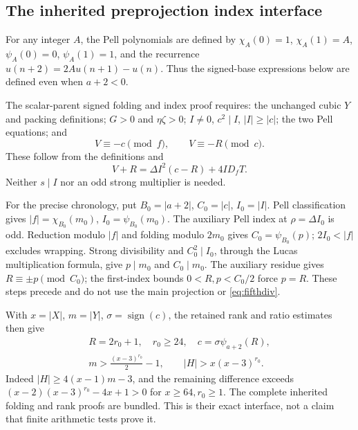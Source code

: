 \subsection{The inherited preprojection index interface}
For any integer $A$, the Pell polynomials are defined by $\chi_A(0)=1$, $\chi_A(1)=A$, $\psi_A(0)=0$, $\psi_A(1)=1$, and the recurrence $u(n+2)=2Au(n+1)-u(n)$. Thus the signed-base expressions below are defined even when $a+2<0$.

The scalar-parent signed folding and index proof requires: the unchanged cubic $Y$ and packing definitions; $G>0$ and $\eta\zeta>0$; $I\ne0$, $c^2\mid I$, $|I|\ge|c|$; the two Pell equations; and
\[
 V\equiv-c\pmod f,\qquad V\equiv-R\pmod c.
\]
These follow from the definitions and
\[
 V+R=\Delta I^2(c-R)+4ID_fT.
\]
Neither $s\mid I$ nor an odd strong multiplier is needed.

For the precise chronology, put $B_0=|a+2|$, $C_0=|c|$, $I_0=|I|$. Pell classification gives $|f|=\chi_{B_0}(m_0)$, $I_0=\psi_{B_0}(m_0)$. The auxiliary Pell index at $\rho=\Delta I_0$ is odd. Reduction modulo $|f|$ and folding modulo $2m_0$ gives $C_0=\psi_{B_0}(p)$; $2I_0<|f|$ excludes wrapping. Strong divisibility and $C_0^2\mid I_0$, through the Lucas multiplication formula, give $p\mid m_0$ and $C_0\mid m_0$. The auxiliary residue gives $R\equiv\pm p\pmod{C_0}$; the first-index bounds $0<R,p<C_0/2$ force $p=R$. These steps precede and do not use the main projection or \eqref{eq:fifthdiv}.

With $x=|X|$, $m=|Y|$, $\sigma=\operatorname{sign}(c)$, the retained rank and ratio estimates then give
\begin{equation}\label{eq:indexbounds}
\begin{gathered}
 R=2r_0+1,\quad r_0\ge24,\quad c=\sigma\psi_{a+2}(R),\\
 m>\frac{(x-3)^{r_0}}2-1,\qquad |H|>x(x-3)^{r_0}.
\end{gathered}
\end{equation}
Indeed $|H|\ge4(x-1)m-3$, and the remaining difference exceeds $(x-2)(x-3)^{r_0}-4x+1>0$ for $x\ge64,r_0\ge1$. The complete inherited folding and rank proofs are bundled. This is their exact interface, not a claim that finite arithmetic tests prove it.

